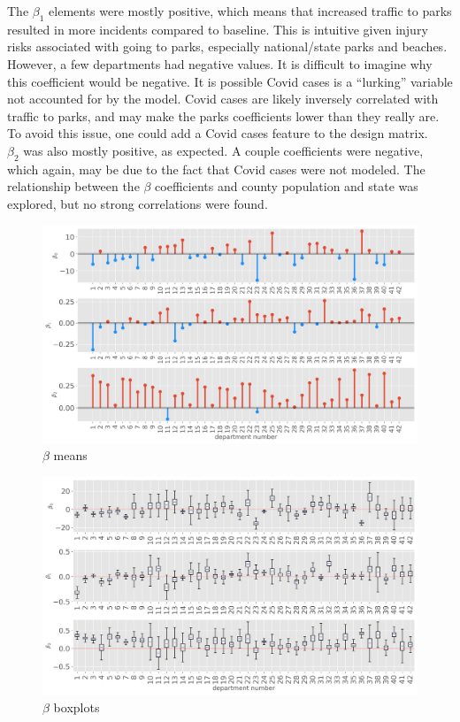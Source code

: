 \documentclass[paper=a4, fontsize=11pt]{scrartcl}
\begin{document}
The $\beta_1$ elements were mostly positive, which means that increased traffic to parks resulted in more incidents compared to baseline. This is intuitive given injury risks associated with going to parks, especially national/state parks and beaches. However, a few departments had negative values. It is difficult to imagine why this coefficient would be negative. It is possible Covid cases  is a ``lurking'' variable not accounted for by the model. Covid cases are likely inversely correlated with traffic to parks, and may make the parks coefficients lower than they really are.  To avoid this issue, one could add a Covid cases feature to the design matrix.\\


 $\beta_2$ was also mostly positive, as expected. A couple coefficients were negative, which again, may be due to the fact that Covid cases were not modeled. The relationship between the $\beta$ coefficients and county population and state was explored, but no strong correlations were found.



\begin{figure}[!htb]\label{all_betas}
\centering
\includegraphics[width=1\textwidth]{project/writeup/mean_betas.png}
\caption{$\beta$ means}\end{figure}


\begin{figure}[!htb]\label{boxplot}
\centering
\includegraphics[width=1\textwidth]{project/writeup/box_plots.png}
\caption{$\beta$ boxplots}
\end{figure}





 

\end{document}
